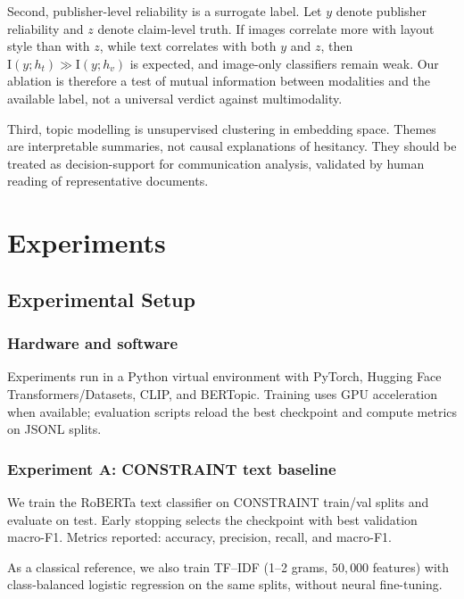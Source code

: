\documentclass[12pt, a4paper]{report}
\begin{document}
Second, publisher-level reliability is a surrogate label.
Let $y$ denote publisher reliability and $z$ denote claim-level truth.
If images correlate more with layout style than with $z$, while text correlates with both $y$ and $z$, then $\mathrm{I}(y;h_t) \gg \mathrm{I}(y;h_v)$ is expected, and image-only classifiers remain weak.
Our ablation is therefore a test of mutual information between modalities and the available label, not a universal verdict against multimodality.

Third, topic modelling is unsupervised clustering in embedding space.
Themes are interpretable summaries, not causal explanations of hesitancy.
They should be treated as decision-support for communication analysis, validated by human reading of representative documents.


\chapter{Experiments}
\label{chap:experiments}

\section{Experimental Setup}
\label{sec:setup}

\subsection{Hardware and software}

Experiments run in a Python virtual environment with PyTorch, Hugging Face Transformers/Datasets, CLIP, and BERTopic.
Training uses GPU acceleration when available; evaluation scripts reload the best checkpoint and compute metrics on JSONL splits.

\subsection{Experiment A: CONSTRAINT text baseline}

We train the RoBERTa text classifier on CONSTRAINT train/val splits and evaluate on test.
Early stopping selects the checkpoint with best validation macro-F1.
Metrics reported: accuracy, precision, recall, and macro-F1.

As a classical reference, we also train TF--IDF (1--2 grams, $50{,}000$ features) with class-balanced logistic regression on the same splits, without neural fine-tuning.
\end{document}
